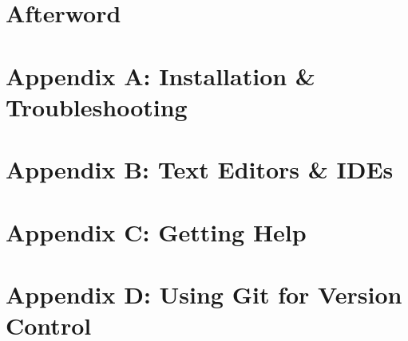 \documentclass[oneside]{book}
\numberwithin{equation}{section}
\begin{document}
\section*{Afterword}


\section{Appendix A: Installation \& Troubleshooting}


\section{Appendix B: Text Editors \& IDEs}


\section{Appendix C: Getting Help}


\section{Appendix D: Using Git for Version Control}



\printbibliography[heading=bibintoc]
	
\end{document}
